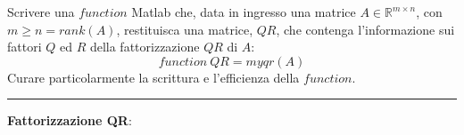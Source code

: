 Scrivere una $function$ Matlab che, data in ingresso una matrice $A\in\mathbb{R}^{m\times n}$, con $m \geq n = rank(A)$, restituisca una matrice, $QR$, che contenga l’informazione sui fattori $Q$ ed $R$ della fattorizzazione $QR$ di $A$:
$$function \ QR = myqr(A)$$
Curare particolarmente la scrittura e l’efficienza della $function$.

\hspace*{\fill}
\par\noindent\rule{\textwidth}{0.4pt}
\hspace*{\fill}

\textbf{Fattorizzazione QR}:

